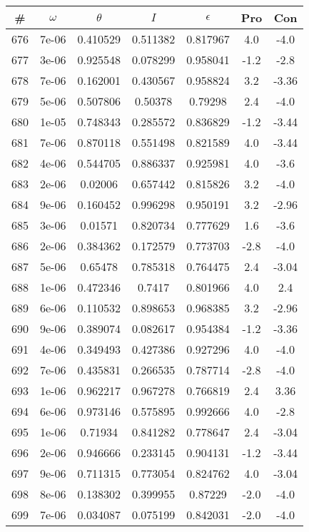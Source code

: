 \begin{table}
\begin{tabular}{c|c|c|c|c|c|c}
\# & $\omega$ & $\theta$ & $I$ & $\epsilon$ & Pro & Con\\
\hline
676 & 7e-06 & 0.410529 & 0.511382 & 0.817967 & 4.0 & -4.0\\
677 & 3e-06 & 0.925548 & 0.078299 & 0.958041 & -1.2 & -2.8\\
678 & 7e-06 & 0.162001 & 0.430567 & 0.958824 & 3.2 & -3.36\\
679 & 5e-06 & 0.507806 & 0.50378 & 0.79298 & 2.4 & -4.0\\
680 & 1e-05 & 0.748343 & 0.285572 & 0.836829 & -1.2 & -3.44\\
681 & 7e-06 & 0.870118 & 0.551498 & 0.821589 & 4.0 & -3.44\\
682 & 4e-06 & 0.544705 & 0.886337 & 0.925981 & 4.0 & -3.6\\
683 & 2e-06 & 0.02006 & 0.657442 & 0.815826 & 3.2 & -4.0\\
684 & 9e-06 & 0.160452 & 0.996298 & 0.950191 & 3.2 & -2.96\\
685 & 3e-06 & 0.01571 & 0.820734 & 0.777629 & 1.6 & -3.6\\
686 & 2e-06 & 0.384362 & 0.172579 & 0.773703 & -2.8 & -4.0\\
687 & 5e-06 & 0.65478 & 0.785318 & 0.764475 & 2.4 & -3.04\\
688 & 1e-06 & 0.472346 & 0.7417 & 0.801966 & 4.0 & 2.4\\
689 & 6e-06 & 0.110532 & 0.898653 & 0.968385 & 3.2 & -2.96\\
690 & 9e-06 & 0.389074 & 0.082617 & 0.954384 & -1.2 & -3.36\\
691 & 4e-06 & 0.349493 & 0.427386 & 0.927296 & 4.0 & -4.0\\
692 & 7e-06 & 0.435831 & 0.266535 & 0.787714 & -2.8 & -4.0\\
693 & 1e-06 & 0.962217 & 0.967278 & 0.766819 & 2.4 & 3.36\\
694 & 6e-06 & 0.973146 & 0.575895 & 0.992666 & 4.0 & -2.8\\
695 & 1e-06 & 0.71934 & 0.841282 & 0.778647 & 2.4 & -3.04\\
696 & 2e-06 & 0.946666 & 0.233145 & 0.904131 & -1.2 & -3.44\\
697 & 9e-06 & 0.711315 & 0.773054 & 0.824762 & 4.0 & -3.04\\
698 & 8e-06 & 0.138302 & 0.399955 & 0.87229 & -2.0 & -4.0\\
699 & 7e-06 & 0.034087 & 0.075199 & 0.842031 & -2.0 & -4.0\\

\end{tabular}
\end{table}
